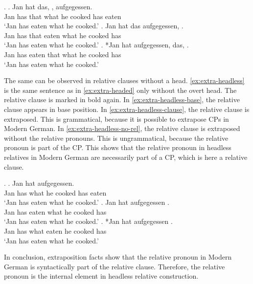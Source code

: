 \ex.\label{ex:extra-headed}
\ag. Jan hat das,    , aufgegessen.\\
 Jan has that what he cooked has eaten\\
`Jan has eaten what he cooked.'\label{ex:extra-headed-base}
\bg. Jan hat das aufgegessen,    .\\
 Jan has that eaten what he cooked has\\
`Jan has eaten what he cooked.'\label{ex:extra-headed-only-clause}
\cg. *Jan hat aufgegessen, das,    .\\
 Jan has eaten that what he cooked has\\
`Jan has eaten what he cooked.'\label{ex:extra-headed-head-clause} 

The same can be observed in relative clauses without a head. \ref{ex:extra-headless} is the same sentence as in \ref{ex:extra-headed} only without the overt head. The relative clause is marked in bold again.
In \ref{ex:extra-headless-base}, the relative clause appears in base position. In \ref{ex:extra-headless-clause}, the relative clause is extraposed. This is grammatical, because it is possible to extrapose CPs in Modern German. In \ref{ex:extra-headless-no-rel}, the relative clause is extraposed without the relative pronouns. This is ungrammatical, because the relative pronoun is part of the CP.
This shows that the relative pronoun in headless relatives in Modern German are necessarily part of a CP, which is here a relative clause.

\ex.\label{ex:extra-headless}
\ag. Jan hat     aufgegessen.\\
Jan has what he cooked has eaten\\
`Jan has eaten what he cooked.'\label{ex:extra-headless-base}
\bg. Jan hat aufgegessen    .\\
Jan has eaten what he cooked has\\
`Jan has eaten what he cooked.'\label{ex:extra-headless-clause}
\bg. *Jan hat  aufgegessen   .\\
Jan has what eaten he cooked has\\
`Jan has eaten what he cooked.'\label{ex:extra-headless-no-rel}

In conclusion, extraposition facts show that the relative pronoun in Modern German is syntactically part of the relative clause. Therefore, the relative pronoun is the internal element in headless relative construction.


